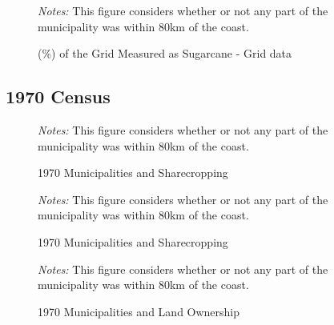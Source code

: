 \documentclass{article}
\begin{document}
\begin{figure}
  \caption{(\%) of the Grid Measured as Sugarcane - Grid data}
  \begin{center}
  \textit{Notes:} This figure considers whether or not any part of the municipality was within 80km of the coast.
  \end{center}
  \label{fig:sugarcane_grid}
\end{figure}

\clearpage

\subsection*{1970 Census}

\begin{figure}[h!]
  \caption{1970 Municipalities and Sharecropping}
  \begin{center}
  \textit{Notes:} This figure considers whether or not any part of the municipality was within 80km of the coast.
  \end{center}
  \label{fig:sharecropping_1970}
\end{figure}

\begin{figure}[h!]
  \caption{1970 Municipalities and Sharecropping}
  \begin{center}
  \textit{Notes:} This figure considers whether or not any part of the municipality was within 80km of the coast.
  \end{center}
  \label{fig:sharecropping_1970}
\end{figure}

\begin{figure}
  \caption{1970 Municipalities and Land Ownership}
  \begin{center}
  \textit{Notes:} This figure considers whether or not any part of the municipality was within 80km of the coast.
  \end{center}
  \label{fig:land_ownership_1970}
\end{figure}
\end{document}
